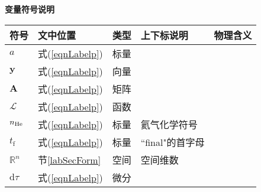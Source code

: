 \documentclass[10pt,plain]{article}
\newcommand{\sihao}{\fontsize{14pt}{\baselineskip}\selectfont}      %
\newcommand{\wuhao}{\fontsize{10.5pt}{\baselineskip}\selectfont}    %
\begin{document}
\newcommand{\Expect}{{\rm I\kern-.3em E}}

\centering 
{\sihao \textbf{变量符号说明}}\\
\wuhao
\tabulinesep=1.2mm
   \begin{longtabu} to 0.85\linewidth {|X[c,m]|X[1.2,c,m]|X[1.8,c,m]|X[3,c,m]|X[3,c,m]|}
        \hline
        \textbf{符号}  & \textbf{文中位置}   & \textbf{类型} & \textbf{上下标说明} & \textbf{物理含义} \\ \hline
        \endhead
        $a$ & 式(\ref{eqnLabelp})   & 标量 &   & \\ \hline
        $\bm y$ & 式(\ref{eqnLabelp})   & 向量 &   & \\ \hline
        $\bm A$ & 式(\ref{eqnLabelp})   & 矩阵 &   & \\ \hline
        $\mathcal{L}$ & 式(\ref{eqnLabelp})   & 函数 &   & \\ \hline
        $n_{\textnormal{He}}$ & 式(\ref{eqnLabelp}) & 标量 &  氦气化学符号 & \\ \hline
        $t_{\mathrm{f}}$ & 式(\ref{eqnLabelp})   & 标量 &  ``final"的首字母 & \\ \hline
        $\mathbb{R}^n$ & 节\ref{labSecForm}   & 空间 & 空间维数  & \\ \hline
        $\mathrm{d}\tau$ & 式(\ref{eqnLabelp}) & 微分 &   &  \\ \hline
   \end{longtabu}
\end{document}
